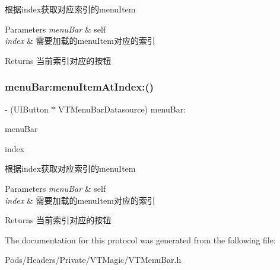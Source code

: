 根据index获取对应索引的menu\+Item


\begin{DoxyParams}{Parameters}
{\em menu\+Bar} & self \\
\hline
{\em index} & 需要加载的menu\+Item对应的索引\\
\hline
\end{DoxyParams}
\begin{DoxyReturn}{Returns}
当前索引对应的按钮 
\end{DoxyReturn}
\mbox{\label{protocol_v_t_menu_bar_datasource_01-p_a2ea6a47a6c08cfc20a33a808f70f0436}} 
\subsubsection{\texorpdfstring{menu\+Bar\+:menu\+Item\+At\+Index\+:()}{menuBar:menuItemAtIndex:()}\hspace{0.1cm}{\footnotesize\ttfamily [3/3]}}
{\footnotesize\ttfamily -\/ (U\+I\+Button $\ast$ V\+T\+Menu\+Bar\+Datasource) menu\+Bar\+: \begin{DoxyParamCaption}\item[{(\mbox{\hyperlink{interface_v_t_menu_bar}{V\+T\+Menu\+Bar}} $\ast$)}]{menu\+Bar }\item[{menuItemAtIndex:(N\+S\+U\+Integer)}]{index }\end{DoxyParamCaption}}

根据index获取对应索引的menu\+Item


\begin{DoxyParams}{Parameters}
{\em menu\+Bar} & self \\
\hline
{\em index} & 需要加载的menu\+Item对应的索引\\
\hline
\end{DoxyParams}
\begin{DoxyReturn}{Returns}
当前索引对应的按钮 
\end{DoxyReturn}


The documentation for this protocol was generated from the following file\+:\begin{DoxyCompactItemize}
\item 
Pods/\+Headers/\+Private/\+V\+T\+Magic/V\+T\+Menu\+Bar.\+h\end{DoxyCompactItemize}
